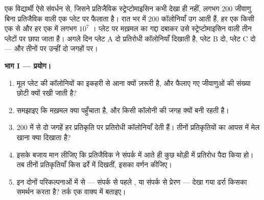 \begin{problem}
\label{pb:g11:mutations:1}
एक विद्यार्थी ऐसे संवर्धन से, जिसने प्रतिजैविक स्ट्रेप्टोमाइसिन कभी देखा
ही नहीं, लगभग 200 जीवाणु बिना प्रतिजैविक वाली एक प्लेट पर फैलाता है। रात
भर में 200 कॉलोनियाँ उग आती हैं, हर एक किसी एक  से और हर एक में
लगभग $10^7$ । प्लेट पर मख़मल का गद्दा दबाकर उसे
स्ट्रेप्टोमाइसिन वाली तीन प्लेटों पर छापा जाता है। अगले दिन प्लेट A दो
प्रतिरोधी कॉलोनियाँ दिखाती है, प्लेट B दो, प्लेट C दो --- और तीनों पर
उन्हीं दो जगहों पर।

\medskip
\noindent\textbf{भाग I --- प्रयोग।}
\begin{enumerate}
  \item मूल प्लेट की कॉलोनियों का इकहरी  से आना क्यों ज़रूरी है,
        और फैलाए गए जीवाणुओं की संख्या छोटी क्यों रखी जाती है?
  \item समझाइए कि मख़मल क्या पहुँचाता है, और किसी कॉलोनी की जगह क्यों
        बनी रहती है।
  \item 200 में से दो जगहें हर प्रतिकृति पर प्रतिरोधी कॉलोनियाँ देती हैं।
        तीनों प्रतिकृतियों का आपस में मेल खाना क्या दिखाता है?
  \item इसके बजाय मान लीजिए कि प्रतिजैविक ने संपर्क में आते ही कुछ थोड़ी
         में प्रतिरोध पैदा किया हो। तब तीनों प्रतिकृतियाँ किस
        ढर्रे में दिखतीं, इसका वर्णन कीजिए।
  \item इन दोनों परिकल्पनाओं में से --- संपर्क से पहले , या
        संपर्क से प्रेरण --- देखा गया ढर्रा किसका समर्थन करता है? तर्क एक
        वाक्य में बताइए।
\end{enumerate}


\end{problem}
